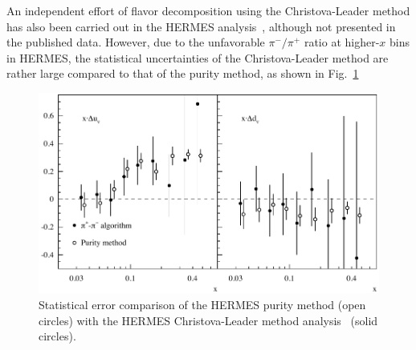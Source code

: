 

An independent effort of flavor decomposition using the \lo Christova-Leader method
has also been carried out in the HERMES analysis~\cite{hermesthesis}, although not presented in the
published data.  However, due to the unfavorable $\pi^-/\pi^+$ ratio at higher-$x$ bins in HERMES,
the statistical uncertainties of the Christova-Leader method are rather large compared to
that of the purity method, as shown in Fig.~\ref{fig:hermescl} 
\begin{figure}[htbp]
  \centering
    \includegraphics[width=0.90\linewidth]{./figs_xj/hermes_thesis_cl_xuvdv-pions.pdf}
\caption{\label{fig:hermescl}
Statistical error comparison of the HERMES purity method (open circles) with the HERMES 
Christova-Leader method analysis~\protect\cite{hermesthesis} (solid circles). 
}
\end{figure}

